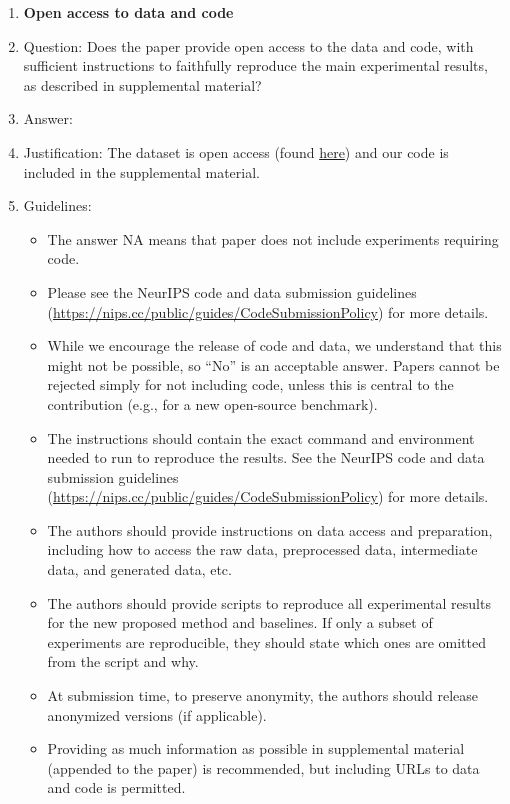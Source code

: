 \documentclass{article}
\begin{document}
\begin{enumerate}
\item {\bf Open access to data and code}
    \item[] Question: Does the paper provide open access to the data and code, with sufficient instructions to faithfully reproduce the main experimental results, as described in supplemental material?
    \item[] Answer: \answerYes{} %
    \item[] Justification: The dataset is open access (found \href{https://myleott.com/op-spam}{here}) and our code is included in the supplemental material.
    \item[] Guidelines:
    \begin{itemize}
        \item The answer NA means that paper does not include experiments requiring code.
        \item Please see the NeurIPS code and data submission guidelines (\url{https://nips.cc/public/guides/CodeSubmissionPolicy}) for more details.
        \item While we encourage the release of code and data, we understand that this might not be possible, so “No” is an acceptable answer. Papers cannot be rejected simply for not including code, unless this is central to the contribution (e.g., for a new open-source benchmark).
        \item The instructions should contain the exact command and environment needed to run to reproduce the results. See the NeurIPS code and data submission guidelines (\url{https://nips.cc/public/guides/CodeSubmissionPolicy}) for more details.
        \item The authors should provide instructions on data access and preparation, including how to access the raw data, preprocessed data, intermediate data, and generated data, etc.
        \item The authors should provide scripts to reproduce all experimental results for the new proposed method and baselines. If only a subset of experiments are reproducible, they should state which ones are omitted from the script and why.
        \item At submission time, to preserve anonymity, the authors should release anonymized versions (if applicable).
        \item Providing as much information as possible in supplemental material (appended to the paper) is recommended, but including URLs to data and code is permitted.
    \end{itemize}



\end{enumerate}
\end{document}

